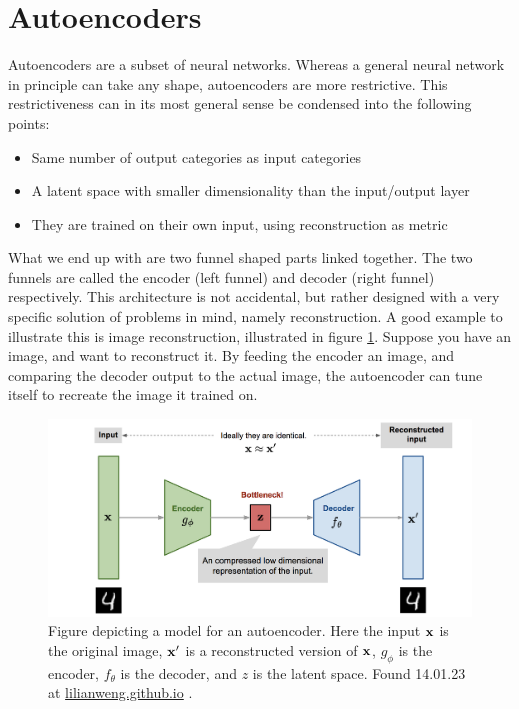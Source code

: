 \section{Autoencoders}\label{sec:autoencder_theory}

Autoencoders are a subset of neural networks. Whereas a general neural network
 in principle can take any shape, autoencoders are more restrictive.
This restrictiveness can in its most general sense be condensed 
into the following points:
\begin{itemize}
    \item Same number of output categories as input categories  
    \item A latent space with smaller dimensionality than the input/output layer  
    \item They are trained on their own input, using reconstruction as metric
\end{itemize}
What we end up with are two funnel shaped parts linked together. The two funnels are 
called the encoder (left funnel) and decoder (right funnel) respectively. This architecture is not 
accidental, but rather designed with a very specific solution of problems in mind, namely reconstruction. 
A good example to illustrate this is image reconstruction, illustrated in figure \ref{fig:ae_denoise}. 
Suppose you have an image, and want to reconstruct it. By feeding the encoder an image, 
and comparing the decoder output to the actual image, the autoencoder can tune itself to recreate the image it trained on. 

\begin{figure}[H]
    \includegraphics[width=\linewidth]{Figures/Machinelearning/autoencoder_imagedenoising.png}
    \caption[Conceptual autoencoder]{Figure depicting a model for an autoencoder. Here the input $\bf{x}$ is the original image, $\bf{x'}$ is a reconstructed version of $\bf{x}$, $g_{\phi}$ is the encoder, $f_{\theta}$ is the decoder, and $z$ is the latent space. Found 14.01.23 at \href{https://lilianweng.github.io/posts/2018-08-12-vae/autoencoder-architecture.png}{lilianweng.github.io} \cite{weng2018VAE}. }
    \label{fig:ae_denoise}
\end{figure}

